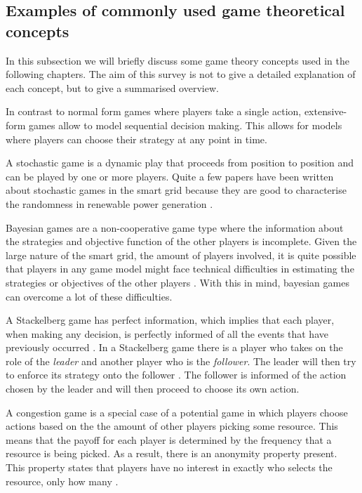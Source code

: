\subsection{Examples of commonly used game theoretical concepts}
In this subsection we will briefly discuss some game theory concepts used in the following chapters. The aim of this survey is not to give a detailed explanation of each concept, but to give a summarised overview.

In contrast to normal form games where players take a single action, extensive-form games allow to model sequential decision making. This allows for models where players can choose their strategy at any point in time.

A stochastic game is a dynamic play that proceeds from position to position \cite{Shapley1953} and can be played by one or more players. Quite a few papers have been written about stochastic games in the smart grid \cite{LiangZhuang2014} because they are good to characterise the randomness in renewable power generation . 

Bayesian games are a non-cooperative game type where the information about the strategies and objective function of the other players is incomplete. Given the large nature of the smart grid, the amount of players involved, it is quite possible that players in any game model might face technical difficulties in estimating the strategies or objectives of the other players \cite{keypaper}. With this in mind, bayesian games can overcome a lot of these difficulties.

A Stackelberg game has perfect information, which implies that each player, when making any decision, is perfectly informed of all the events that have previously occurred \cite{CourseInGameTheory}.
In a Stackelberg game there is a player who takes on the role of the \textit{leader} and another player who is the \textit{follower}. The leader will then try to enforce its strategy onto the follower \cite{ShohamLeyton-Brown2008}. The follower is informed of the action chosen by the leader and will then proceed to choose its own action. 

A congestion game is a special case of a potential  game \cite{IbarsNavarroGiupponi2010, MondererShapley1996, ShohamLeyton-Brown2008} in which players choose actions based on the the amount of other players picking some resource. This means that the payoff for each player is determined by the frequency that a resource is being picked. As a result, there is an anonymity property present. This property states that players have no interest in exactly who selects the resource, only how many \cite{ShohamLeyton-Brown2008}.

